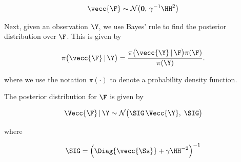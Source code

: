 \begin{equation}
    \vecc{\F} \sim \mathcal{N}\big(\mathbf{0}, \, \gamma^{-1} \HH^2\big) 
\end{equation}

Next, given an observation $\Y$, we use Bayes' rule to find the posterior distribution over $\F$. This is given by

\begin{equation}
    \pi\big(\vecc{\F} \, | \, \Y \big) = \frac{\pi\big(\vecc{\Y} \, | \, \F \big) \pi(\F) }{\pi(\Y)}.
\end{equation}

where we use the notation $\pi(\cdot)$ to denote a probability density function.

\begin{theorem}
    The posterior distribution for $\F$ is given by 

    \begin{equation}
        \label{eq:F_post}
            \Vecc{\F} \, | \, \Y \sim \mathcal{N} \big(\SIG \, \Vecc{\Y}, \; \SIG \big)
        \end{equation}
        
        \noindent where 
        
        \begin{equation}
        \label{eq:Sig_post}
            \SIG = \Big(\Diag{\vecc{\Ss}} + \gamma  \HH^{-2}\Big)^{-1}
        \end{equation}

\end{theorem}

